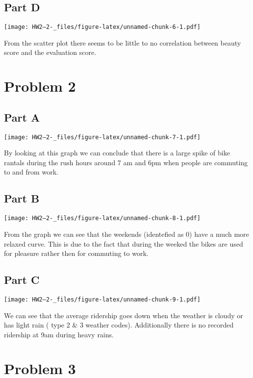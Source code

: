 \documentclass[
]{article}
\begin{document}
\hypertarget{part-d}{%
\subsection{Part D}\label{part-d}}

\texttt{[image: HW2--2-\_files/figure-latex/unnamed-chunk-6-1.pdf]}

From the scatter plot there seems to be little to no correlation between
beauty score and the evaluation score.

\hypertarget{problem-2}{%
\section{Problem 2}\label{problem-2}}

\hypertarget{part-a-1}{%
\subsection{Part A}\label{part-a-1}}

\texttt{[image: HW2--2-\_files/figure-latex/unnamed-chunk-7-1.pdf]}

By looking at this graph we can conclude that there is a large spike of
bike rantals during the rush hours around 7 am and 6pm when people are
commuting to and from work.

\hypertarget{part-b-1}{%
\subsection{Part B}\label{part-b-1}}

\texttt{[image: HW2--2-\_files/figure-latex/unnamed-chunk-8-1.pdf]}

From the graph we can see that the weekends (identefied as 0) have a
much more relaxed curve. This is due to the fact that during the weeked
the bikes are used for pleasure rather then for commuting to work.

\hypertarget{part-c-1}{%
\subsection{Part C}\label{part-c-1}}

\texttt{[image: HW2--2-\_files/figure-latex/unnamed-chunk-9-1.pdf]}

We can see that the average ridership goes down when the weather is
cloudy or has light rain ( type 2 \& 3 weather codes). Additionally
there is no recorded ridership at 9am during heavy rains.

\hypertarget{problem-3}{%
\section{Problem 3}\label{problem-3}}
\end{document}

